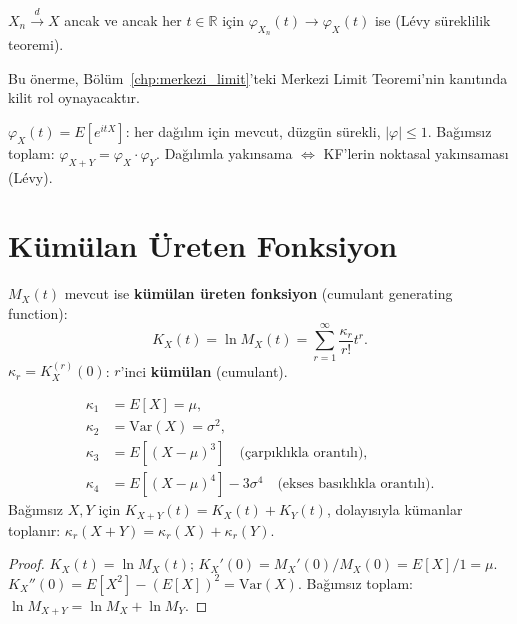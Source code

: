 \begin{onerme}
\label{prop:kf_yaklasim}
$X_n \xrightarrow{d} X$ ancak ve ancak her $t \in \mathbb{R}$ için
$\varphi_{X_n}(t) \to \varphi_X(t)$ ise (Lévy süreklilik teoremi).
\end{onerme}

Bu önerme, Bölüm~\ref{chp:merkezi_limit}'teki Merkezi Limit Teoremi'nin kanıtında
kilit rol oynayacaktır.

\begin{mikroozet}
$\varphi_X(t) = E[e^{itX}]$: her dağılım için mevcut, düzgün sürekli, $|\varphi| \leq 1$.
Bağımsız toplam: $\varphi_{X+Y} = \varphi_X \cdot \varphi_Y$.
Dağılımla yakınsama $\Leftrightarrow$ KF'lerin noktasal yakınsaması (Lévy).
\end{mikroozet}

\section{Kümülan Üreten Fonksiyon}
\label{sec:kgf}

\begin{tanim}
\label{def:kgf}
$M_X(t)$ mevcut ise \textbf{kümülan üreten fonksiyon} (cumulant generating function):
\[
  K_X(t) = \ln M_X(t) = \sum_{r=1}^\infty \frac{\kappa_r}{r!} t^r.
\]
$\kappa_r = K_X^{(r)}(0)$: $r$'inci \textbf{kümülan} (cumulant).
\end{tanim}

\begin{onerme}
\label{prop:kumulanlar}
\begin{align*}
  \kappa_1 &= E[X] = \mu, \\
  \kappa_2 &= \mathrm{Var}(X) = \sigma^2, \\
  \kappa_3 &= E[(X-\mu)^3] \quad \text{(çarpıklıkla orantılı)}, \\
  \kappa_4 &= E[(X-\mu)^4] - 3\sigma^4 \quad \text{(ekses basıklıkla orantılı)}.
\end{align*}
Bağımsız $X, Y$ için $K_{X+Y}(t) = K_X(t) + K_Y(t)$, dolayısıyla
kümanlar toplanır: $\kappa_r(X+Y) = \kappa_r(X) + \kappa_r(Y)$.
\end{onerme}

\begin{proof}
$K_X(t) = \ln M_X(t)$; $K_X'(0) = M_X'(0)/M_X(0) = E[X]/1 = \mu$.
$K_X''(0) = E[X^2] - (E[X])^2 = \mathrm{Var}(X)$.
Bağımsız toplam: $\ln M_{X+Y} = \ln M_X + \ln M_Y$.
\end{proof}

